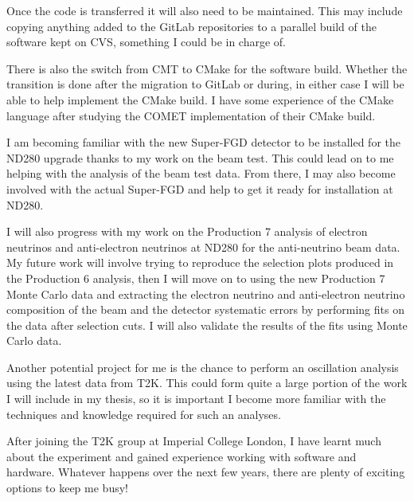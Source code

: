 \documentclass[aps,pra,12pt,notitlepage,tightenlines]{revtex4-1}
\begin{document}
Once the code is transferred it will also need to be maintained. This may include copying anything added to the GitLab repositories to a parallel build of the software kept on CVS, something I could be in charge of. 

There is also the switch from CMT to CMake for the software build. Whether the transition is done after the migration to GitLab or during, in either case I will be able to help implement the CMake build. I have some experience of the CMake language after studying the COMET implementation of their CMake build.

I am becoming familiar with the new Super-FGD detector to be installed for the ND280 upgrade thanks to my work on the beam test. This could lead on to me helping with the analysis of the beam test data. From there, I may also become involved with the actual Super-FGD and help to get it ready for installation at ND280.

I will also progress with my work on the Production 7 analysis of electron neutrinos and anti-electron neutrinos at ND280 for the anti-neutrino beam data. My future work will involve trying to reproduce the selection plots produced in the Production 6 analysis, then I will move on to using the new Production 7 Monte Carlo data and extracting the electron neutrino and anti-electron neutrino composition of the beam and the detector systematic errors by performing fits on the data after selection cuts. I will also validate the results of the fits using Monte Carlo data.

Another potential project for me is the chance to perform an oscillation analysis using the latest data from T2K. This could form quite a large portion of the work I will include in my thesis, so it is important I become more familiar with the techniques and knowledge required for such an analyses.

After joining the T2K group at Imperial College London, I have learnt much about the experiment and gained experience working with software and hardware. Whatever happens over the next few years, there are plenty of exciting options to keep me busy!




\end{document}
